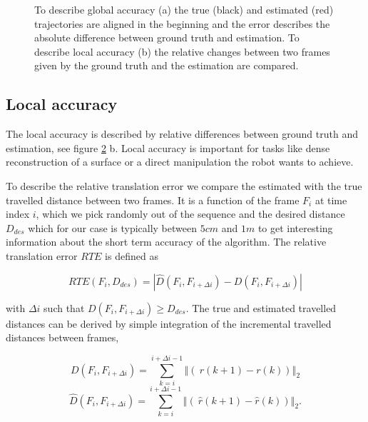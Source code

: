 \begin{figure}
\begin{subfigure}[b]{0.28\textwidth}
    \caption{}
    \label{fig:4}
  \end{subfigure}
  \hspace*{1cm}
\caption{To describe global accuracy (a) the true (black) and estimated (red) trajectories are aligned in the beginning and the error describes the absolute difference between ground truth and estimation. To describe local accuracy (b) the relative changes between two frames given by the ground truth and the estimation are compared.}
\label{pics:absolute_relative}
\end{figure}





\subsection{Local accuracy}
\label{sec:local}

The local accuracy is described by relative differences between ground truth and estimation, see figure \ref{pics:absolute_relative} b. Local accuracy is important for tasks like dense reconstruction of a surface or a direct manipulation the robot wants to achieve. 

To describe the relative translation error we compare the estimated with the true travelled distance between two frames. It is a function of the frame $F_i$ at time index $i$, which we pick randomly out of the sequence and the desired distance $D_{des}$ which for our case is typically between $5cm$ and $1m$ to get interesting information about the short term accuracy of the algorithm. The relative translation error $RTE$ is defined as

\begin{equation}
RTE \left( F_i, D_{des} \right) = \left| \hat{D} \left( F_i, F_{i+\Delta i} \right) - D \left( F_i, F_{i+\Delta i} \right)\right|
\end{equation}

with $ \Delta i $ such that $ D \left( F_i, F_{i+\Delta i} \right) \geq D_{des} $. The true and estimated travelled distances can be derived by simple integration of the incremental travelled distances between frames,

\begin{equation}
       D \left( F_i, F_{i+\Delta i} \right) = \sum_{k=i}^{i+\Delta i-1} \left\Vert\left(\ r \left( k+1 \right) - r \left( k \right) \right) \right\Vert_2
\end{equation}
\begin{equation}
       \hat{D} \left( F_i, F_{i+\Delta i} \right) = \sum_{k=i}^{i+\Delta i-1} \left\Vert\left(\ \hat{r} \left( k+1 \right) - \hat{r} \left( k \right) \right) \right\Vert_2 .
\end{equation}

